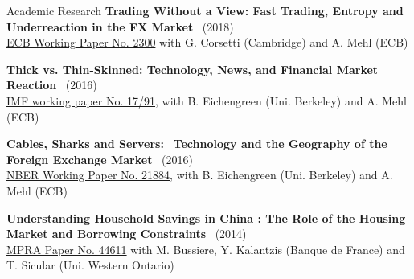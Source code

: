 \documentclass[usegeometry, 10pt, a4paper]{cv} %
\newcommand{\activite}[1]{\textbf{#1}\ }
\begin{document}
\begin{rubriquetableau}[0.95\textwidth]{Academic Research}
\activite{Trading Without a View: Fast Trading, Entropy and Underreaction in the FX  Market} (2018) \\
\hspace{0.6cm}
\small{\href{https://www.ecb.europa.eu/pub/pdf/scpwps/ecb.wp2300~68bda93b78.en.pdf}{ECB
    Working Paper No. 2300} with G. Corsetti (Cambridge) and A. Mehl (ECB)}
\vspace{0.4cm} 


\activite{Thick vs. Thin-Skinned: Technology, News, and Financial Market Reaction} (2016) \\
\hspace{0.6cm} \small{\href{https://www.imf.org/en/Publications/WP/Issues/2017/04/07/Thick-vs-44810}{IMF working paper No. 17/91}, with B. Eichengreen (Uni. Berkeley) and A. Mehl (ECB)}
\vspace{0.4cm} 

\activite{Cables, Sharks and Servers:}
\activite{Technology and the Geography of the Foreign Exchange Market} (2016)\\
\hspace{0.6cm} \small{\href{https://www.nber.org/papers/w21884}{NBER Working Paper No. 21884}, with B. Eichengreen (Uni. Berkeley) and A. Mehl (ECB)}
\vspace{0.4cm} 
    
\activite{Understanding Household Savings in China : The Role of the Housing Market and Borrowing Constraints} (2014)  \\
\hspace{0.6cm}
\small{\href{https://ideas.repec.org/p/pra/mprapa/44611.html}{MPRA Paper
    No. 44611} with M. Bussiere, Y. Kalantzis (Banque de France) and T. Sicular (Uni. Western Ontario)}
\end{rubriquetableau}

\vspace{0.8cm}
\end{document}
